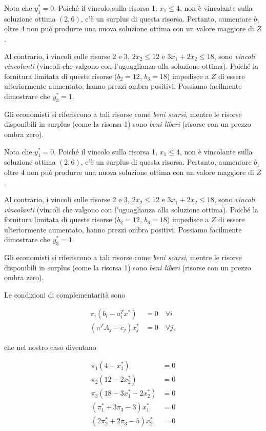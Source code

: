 \documentclass[a4paper, 11pt]{article}
\begin{document}
        Nota che $y_1^* = 0$. Poiché il vincolo sulla risorsa 1, $x_1 \leq 4$, non è vincolante sulla soluzione ottima $(2, 6)$, c'è un surplus di questa risorsa. Pertanto, aumentare $b_1$ oltre 4 non può produrre una nuova soluzione ottima con un valore maggiore di $Z$.

        Al contrario, i vincoli sulle risorse 2 e 3, $2x_2 \leq 12$ e $3x_1 + 2x_2 \leq 18$, sono \textit{vincoli vincolanti} (vincoli che valgono con l'uguaglianza alla soluzione ottima). Poiché la fornitura limitata di queste risorse ($b_2 = 12$, $b_3 = 18$) impedisce a $Z$ di essere ulteriormente aumentato, hanno prezzi ombra positivi. Possiamo facilmente dimostrare che $y_3^* = 1$.

        Gli economisti si riferiscono a tali risorse come \textit{beni scarsi}, mentre le risorse disponibili in surplus (come la risorsa 1) sono \textit{beni liberi} (risorse con un prezzo ombra zero).



        Nota che $y_1^* = 0$. Poiché il vincolo sulla risorsa 1, $x_1 \leq 4$, non è vincolante sulla soluzione ottima $(2, 6)$, c'è un surplus di questa risorsa. Pertanto, aumentare $b_1$ oltre 4 non può produrre una nuova soluzione ottima con un valore maggiore di $Z$.

        Al contrario, i vincoli sulle risorse 2 e 3, $2x_2 \leq 12$ e $3x_1 + 2x_2 \leq 18$, sono \textit{vincoli vincolanti} (vincoli che valgono con l'uguaglianza alla soluzione ottima). Poiché la fornitura limitata di queste risorse ($b_2 = 12$, $b_3 = 18$) impedisce a $Z$ di essere ulteriormente aumentato, hanno prezzi ombra positivi. Possiamo facilmente dimostrare che $y_3^* = 1$.

        Gli economisti si riferiscono a tali risorse come \textit{beni scarsi}, mentre le risorse disponibili in surplus (come la risorsa 1) sono \textit{beni liberi} (risorse con un prezzo ombra zero).



        Le condizioni di complementarità sono

        \[
        \begin{aligned}
        \pi_i (b_i - a_i^T x^*) &= 0 \quad \forall i \\
        (\pi^T A_j - c_j)x_j^* &= 0 \quad \forall j,
        \end{aligned}
        \]

        che nel nostro caso diventano

        \[
        \begin{aligned}
        \pi_1 (4 - x_1^*) &= 0 \\
        \pi_2 (12 - 2x_2^*) &= 0 \\
        \pi_3 (18 - 3x_1^* - 2x_2^*) &= 0 \\
        (\pi_1^* + 3\pi_3 - 3) x_1^* &= 0 \\
        (2\pi_2^* + 2\pi_3 - 5) x_2^* &= 0
        \end{aligned}
        \]
\end{document}
